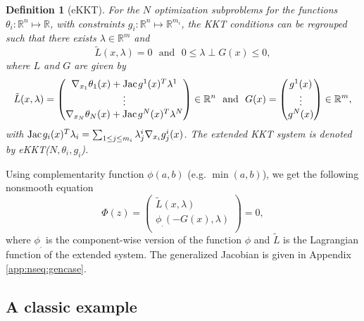 \documentclass[11pt]{article}
\newcommand{\txtm}[1]{\textrm{~~#1~~}}
\newcommand{\Jac}{\textrm{Jac\hskip+.1em}}
\newcommand{\R}{\ensuremath{\mathbb{R}}}
\newtheorem{mydef}{Definition}
\begin{document}
\begin{mydef}[eKKT]
For the $N$ optimization subproblems for the functions $\theta_i: \R^{n} \mapsto \R$, with constraints $g_i: \R^{n} \mapsto \R^{m_i}$, the KKT conditions can be regrouped such that
there exists $\lambda \in \R^m$ and 
$$
\tilde L(x, \lambda) = 0 \txtm{and} 0 \leq \lambda \perp  G(x) \leq  0,
$$
where $L$ and $G$ are given by
$$
\tilde L(x, \lambda) = 
\left( 
\begin{matrix}
\nabla_{x_1} \theta_1(x) + \Jac g^{1}(x)^T \lambda^1 \\
\vdots \\
\nabla_{x_N} \theta_ N(x) + \Jac g^{N}(x)^T \lambda^N \\
\end{matrix}
\right)  
\in \R^{n}
\txtm{and}
G(x) = 
\left( 
\begin{matrix}
g^1(x) \\
\vdots \\
g^N(x) \\
\end{matrix}
\right) 
\in \R^{m},
$$
with $\Jac g_{i}(x)^T \lambda_i = \sum_{ 1 \leq j \leq m_i } \lambda_{j}^i \nabla_{x_i} g_{j}^i(x)  $. The extended KKT system is denoted by eKKT($N, \theta_i, g_i$).
\end{mydef}

Using complementarity function $\phi(a,b)$ (e.g. $\min(a,b)$), we get the following nonsmooth equation
$$
\Phi(z) = 
\left( 
\begin{matrix}
\tilde L(x, \lambda) \\
\phi_.(-G(x), \lambda) \\
\end{matrix}
\right) = 0 ,
$$
where $\phi_.$ is the component-wise version of the function $\phi$ and $\tilde L$ is the Lagrangian function of the extended system.
The generalized Jacobian is given in Appendix \ref{app:nseq:gencase}.

\subsection{A classic example}
\end{document}
